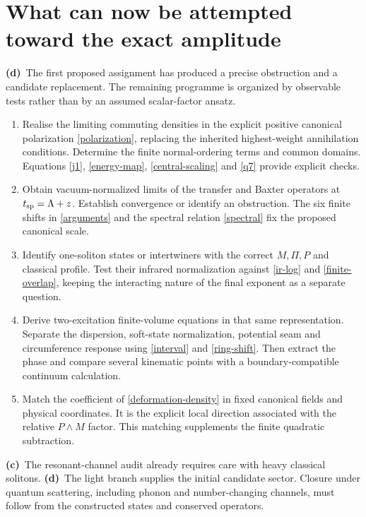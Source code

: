 \documentclass[11pt,a4paper]{article}
\newcommand{\C}{\textbf{(c)}\ }
\newcommand{\D}{\textbf{(d)}\ }
\begin{document}
\section{What can now be attempted toward the exact amplitude}
\D The first proposed assignment has produced a precise obstruction and
a candidate replacement. The remaining programme is organized by observable
tests rather than by an assumed scalar-factor ansatz.

\begin{enumerate}
\item Realise the limiting commuting densities in the explicit positive
canonical polarization \eqref{polarization}, replacing the inherited
highest-weight annihilation conditions. Determine the finite normal-ordering
terms and common domains. Equations \eqref{j1}, \eqref{energy-map},
\eqref{central-scaling} and \eqref{q7} provide explicit checks.
\item Obtain vacuum-normalized limits of the transfer and Baxter operators
at $t_{\rm sp}=\Lambda+z$. Establish convergence or identify an obstruction.
The six finite shifts in \eqref{arguments} and the spectral relation
\eqref{spectral} fix the proposed canonical scale.
\item Identify one-soliton states or intertwiners with the correct $M,\Pi,P$
and classical profile. Test their infrared normalization against
\eqref{ir-log} and \eqref{finite-overlap}, keeping the interacting nature
of the final exponent as a separate question.
\item Derive two-excitation finite-volume equations in that same
representation. Separate the dispersion, soft-state normalization,
potential seam and circumference response using \eqref{interval} and
\eqref{ring-shift}. Then extract the phase and compare several kinematic
points with a boundary-compatible continuum calculation.
\item Match the coefficient of \eqref{deformation-density} in fixed
canonical fields and physical coordinates. It is the explicit local
direction associated with the relative $P\wedge M$ factor.
This matching supplements the finite quadratic subtraction.
\end{enumerate}

\C The resonant-channel audit already requires care with heavy classical
solitons. \D The light branch supplies the initial candidate sector.
Closure under quantum scattering, including phonon and number-changing
channels, must follow from the constructed states and conserved operators.
\end{document}
